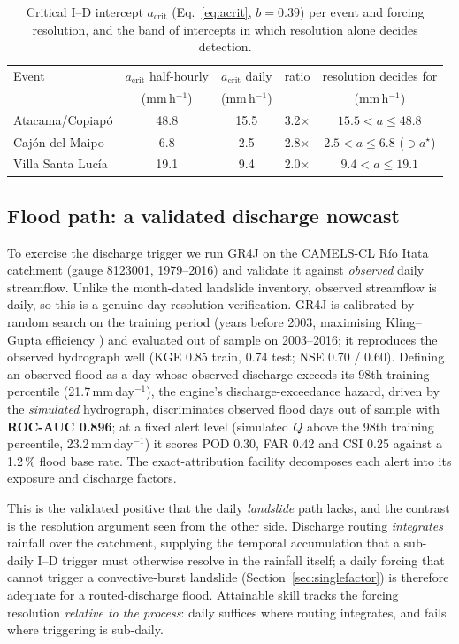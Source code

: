 \documentclass[authoryear,preprint,review,12pt]{elsarticle}
\begin{document}
\begin{table}[ht]
\centering
\caption{Critical I--D intercept $a_\mathrm{crit}$ (Eq.~\ref{eq:acrit}, $b=0.39$) per
event and forcing resolution, and the band of intercepts in which resolution alone
decides detection.}
\label{tab:intercept}
\begin{tabular}{@{}lcccc@{}}
\toprule
Event & $a_\mathrm{crit}$ half-hourly & $a_\mathrm{crit}$ daily & ratio & resolution decides for \\
 & (mm\,h$^{-1}$) & (mm\,h$^{-1}$) & & (mm\,h$^{-1}$) \\
\midrule
Atacama/Copiap\'o & 48.8 & 15.5 & 3.2$\times$ & $15.5 < a \leq 48.8$ \\
Caj\'on del Maipo & 6.8 & 2.5 & 2.8$\times$ & $2.5 < a \leq 6.8$ \hfill ($\ni a^\star$) \\
Villa Santa Luc\'ia & 19.1 & 9.4 & 2.0$\times$ & $9.4 < a \leq 19.1$ \\
\bottomrule
\end{tabular}
\end{table}

\subsection{Flood path: a validated discharge nowcast}

To exercise the discharge trigger we run GR4J \citep{perrin2003} on the CAMELS-CL
R\'io Itata catchment (gauge 8123001, 1979--2016) and validate it against
\emph{observed} daily streamflow. Unlike the month-dated landslide inventory,
observed streamflow is daily, so this is a genuine day-resolution verification.
GR4J is calibrated by random search on the training period (years before 2003,
maximising Kling--Gupta efficiency \citep{gupta2009}) and evaluated out of sample on 2003--2016; it
reproduces the observed hydrograph well (KGE 0.85 train, 0.74 test; NSE 0.70 / 0.60).
Defining an observed flood as a day whose observed discharge exceeds its 98th
training percentile (21.7\,mm\,day$^{-1}$), the engine's discharge-exceedance hazard,
driven by the \emph{simulated} hydrograph, discriminates observed flood days out of
sample with \textbf{ROC-AUC 0.896}; at a fixed alert level (simulated $Q$ above the
98th training percentile, 23.2\,mm\,day$^{-1}$) it scores POD 0.30, FAR 0.42 and
CSI 0.25 against a 1.2\,\% flood base rate. The exact-attribution facility
decomposes each alert into its exposure and discharge factors.

This is the validated positive that the daily \emph{landslide} path lacks, and the
contrast is the resolution argument seen from the other side. Discharge routing
\emph{integrates} rainfall over the catchment, supplying the temporal accumulation
that a sub-daily I--D trigger must otherwise resolve in the rainfall itself; a daily
forcing that cannot trigger a convective-burst landslide
(Section~\ref{sec:singlefactor}) is therefore adequate for a routed-discharge flood. Attainable skill
tracks the forcing resolution \emph{relative to the process}: daily suffices where
routing integrates, and fails where triggering is sub-daily.
\end{document}
